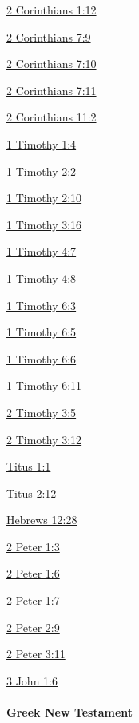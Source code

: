 			\begin{compactdesc}
				\item[{\hyperref[2CORINTHIANS-1-12]{2 Corinthians 1:12}}] 
				\item[{\hyperref[2CORINTHIANS-7-9]{2 Corinthians 7:9}}]
				\item[{\hyperref[2CORINTHIANS-7-10]{2 Corinthians 7:10}}]
				\item[{\hyperref[2CORINTHIANS-7-11]{2 Corinthians 7:11}}]
				\item[{\hyperref[2CORINTHIANS-11-2]{2 Corinthians 11:2}}]
				\item[{\hyperref[1TIMOTHY-1-4]{1 Timothy 1:4}}]
				\item[{\hyperref[1TIMOTHY-2-2]{1 Timothy 2:2}}]
				\item[{\hyperref[1TIMOTHY-2-10]{1 Timothy 2:10}}]
				\item[{\hyperref[1TIMOTHY-3-16]{1 Timothy 3:16}}]
				\item[{\hyperref[1TIMOTHY-4-7]{1 Timothy 4:7}}]
				\item[{\hyperref[1TIMOTHY-4-8]{1 Timothy 4:8}}]
				\item[{\hyperref[1TIMOTHY-6-3]{1 Timothy 6:3}}]
				\item[{\hyperref[1TIMOTHY-6-5]{1 Timothy 6:5}}]
				\item[{\hyperref[1TIMOTHY-6-6]{1 Timothy 6:6}}]
				\item[{\hyperref[1TIMOTHY-6-11]{1 Timothy 6:11}}]
				\item[{\hyperref[2TIMOTHY-3-5]{2 Timothy 3:5}}]
				\item[{\hyperref[2TIMOTHY-3-12]{2 Timothy 3:12}}]
				\item[{\hyperref[TITUS-1-1]{Titus 1:1}}]
				\item[{\hyperref[TITUS-2-12]{Titus 2:12}}]
				\item[{\hyperref[HEBREWS-12-28]{Hebrews 12:28}}]
				\item[{\hyperref[2PETER-1-3]{2 Peter 1:3}}]
				\item[{\hyperref[2PETER-1-6]{2 Peter 1:6}}]
				\item[{\hyperref[2PETER-1-7]{2 Peter 1:7}}]
				\item[{\hyperref[2PETER-2-9]{2 Peter 2:9}}]
				\item[{\hyperref[2PETER-3-11]{2 Peter 3:11}}]
				\item[{\hyperref[3JOHN-1-6]{3 John 1:6}}]
			\end{compactdesc}
			
		\paragraph{Greek New Testament} %
			\label{GODLINESS-GREEK}
			
